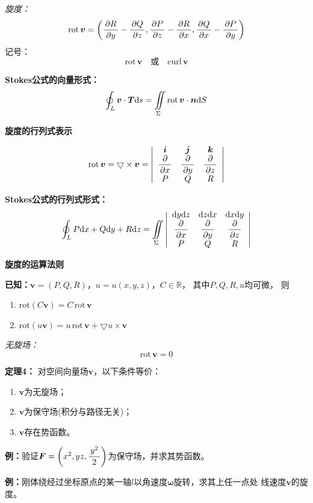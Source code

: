 {\it 旋度：}
$${\mathrm{rot}\,\bm{v}=\left(
\displaystyle\frac{\,{\partial R}\,}{\,{\partial y}\,}-\displaystyle\frac{\,{\partial Q}\,}{\,{\partial z}\,},
\displaystyle\frac{\,{\partial P}\,}{\,{\partial z}\,}-\displaystyle\frac{\,{\partial R}\,}{\,{\partial x}\,},
\displaystyle\frac{\,{\partial Q}\,}{\,{\partial x}\,}-\displaystyle\frac{\,{\partial P}\,}{\,{\partial y}\,}
\right)}$$ 
{记号：}
$$\mathrm{rot}\,\bm{v}\quad \mbox{或}\quad\mathrm{curl}\,\bm{v}$$ 

{\bf Stokes公式的向量形式：}
$${\oint_L\bm{v}\cdot\bm{T}\mathrm{d} s
=\iint\limits_{\Sigma}\mathrm{rot}\,\bm{v}\cdot\bm{n}\mathrm{d} S}$$

{\bf 旋度的行列式表示}

$${\mathrm{rot}\,\bm{v}=\bigtriangledown\times\bm{v} 
=\left|\begin{array}{ccc}
	\bm{i} & \bm{j} & \bm{k}\\
	\displaystyle\frac{\,{\partial}\,}{\,{\partial x}\,} & \displaystyle\frac{\,{\partial}\,}{\,{\partial y}\,} & \displaystyle\frac{\,{\partial}\,}{\,{\partial z}\,}\\
	P & Q & R
\end{array}\right|}$$ 

{\bf Stokes公式的行列式形式：} 
$${\oint_LP\mathrm{d} x+Q\mathrm{d} y+R\mathrm{d} z=\iint\limits_{\Sigma}
\left|\begin{array}{ccc}
	\mathrm{d} y\mathrm{d} z & \mathrm{d} z\mathrm{d} x & \mathrm{d} x\mathrm{d} y\\
	\displaystyle\frac{\,{\partial}\,}{\,{\partial x}\,} & \displaystyle\frac{\,{\partial}\,}{\,{\partial y}\,} & \displaystyle\frac{\,{\partial}\,}{\,{\partial z}\,}\\
	P & Q & R
\end{array}\right|}$$

{\bf 旋度的运算法则}

{\bf 已知：}$\bm{v}=(P,Q,R)$，$u=u(x,y,z)$，$C\in\mathbb{R}$， 
其中$P,Q,R,u$均可微， 则
\begin{enumerate}[(1)]
  \setlength{\itemindent}{1cm}
  \item ${\mathrm{rot}(C\bm{v}) =C\,\mathrm{rot}\,\bm{v}}$ 
  \item ${\mathrm{rot}(u\bm{v}) =u\,\mathrm{rot}\,\bm{v}
  +\bigtriangledown u\times\bm{v}}$
\end{enumerate}

{\it 无旋场：}
$${\mathrm{rot}\,\bm{v}=0}$$ 

{\bf 定理4：}
对空间向量场$\bm{v}$，以下条件等价： 
\begin{enumerate}[(1)]
  \setlength{\itemindent}{1cm}
  \item $\bm{v}$为无旋场； 
  \item $\bm{v}$为保守场(积分与路径无关)； 
  \item $\bm{v}$存在势函数。
\end{enumerate}

{\bf 例：}验证$\bm{F}=\left(x^2,yz,\displaystyle\frac{\,{y^2}\,}{\,{2}\,}\right)$为保守场，并求其势函数。

{\bf 例：}刚体绕经过坐标原点的某一轴$l$以角速度$\bm{\omega}$旋转，求其上任一点处
线速度$\bm{v}$的旋度。

